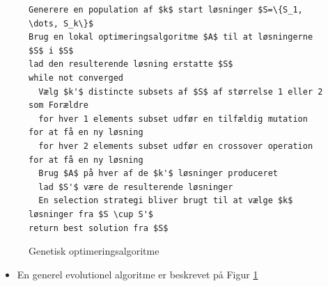 \begin{itemize}
\begin{figure}[ht]
  \centering
\begin{lstlisting}  
Generere en population af $k$ start løsninger $S=\{S_1, \dots, S_k\}$
Brug en lokal optimeringsalgoritme $A$ til at løsningerne $S$ i $S$
lad den resulterende løsning erstatte $S$ 
while not converged
  Vælg $k'$ distincte subsets af $S$ af størrelse 1 eller 2 som Forældre
  for hver 1 elements subset udfør en tilfældig mutation for at få en ny løsning 
  for hver 2 elements subset udfør en crossover operation for at få en ny løsning 
  Brug $A$ på hver af de $k'$ løsninger produceret
  lad $S'$ være de resulterende løsninger
  En selection strategi bliver brugt til at vælge $k$ løsninger fra $S \cup S'$
return best solution fra $S$  
\end{lstlisting}
  \caption{Genetisk optimeringsalgoritme\label{fig:evolutionary}}
\end{figure}
  \begin{itemize}
  	\item En generel evolutionel algoritme er beskrevet på Figur \ref{fig:evolutionary}
  \end{itemize}
\end{itemize}

\newpage
